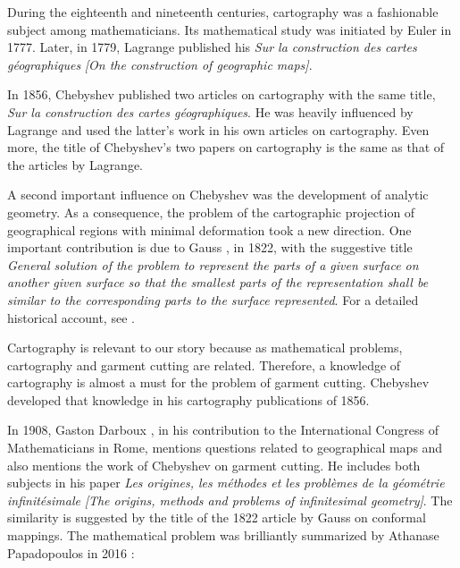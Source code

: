 \documentclass[12pt]{article}
\begin{document}
\normalsize


\bigskip

During the eighteenth and nineteenth centuries, cartography was a fashionable subject among mathematicians. Its mathematical study was initiated by Euler in 1777. Later, in 1779, Lagrange \cite{Lagrange1779} published his {\it Sur la construction des cartes g\'eographiques} {\it [On the construction of geographic maps]}.

In 1856, Chebyshev published two articles \cite{Chebyshev1856a,Chebyshev1856b} on cartography with the same title, {\it Sur la construction des cartes g\'eographiques}. He was heavily influenced by Lagrange and used the latter's work in his own articles on cartography. Even more, the title of Chebyshev's two papers on cartography is the same as that of the articles by Lagrange.

A second important influence on Chebyshev was the development of analytic geometry. As a consequence, the problem of the cartographic projection of geographical regions with minimal deformation took a new direction. One important contribution is due to Gauss \cite{Gauss1822}, in 1822, with the suggestive title {\it General solution of the problem to represent the parts of a given surface on another given surface so that the smallest parts of the representation shall be similar to the corresponding parts to the surface represented}. For a detailed historical account, see \cite{Papadopoulos2022a,Papadopoulos2022b}.

Cartography is relevant to our story because as mathematical problems, cartography and garment cutting are related. Therefore, a knowledge of cartography is almost a must for the problem of garment cutting. Chebyshev developed that knowledge in his cartography publications of 1856.

In 1908, Gaston Darboux \cite{Darboux1909}, in his contribution to the International Congress of Mathematicians in Rome, mentions questions related to geographical maps and also mentions the work of Chebyshev on garment cutting. He includes both subjects in his paper {\it Les origines, les m\'ethodes et les probl\`emes de la g\'eom\'etrie infinit\'esimale} {\it [The origins, methods and problems of infinitesimal geometry]}. The similarity is suggested by the title of the 1822 article by Gauss on conformal mappings. The mathematical problem was brilliantly summarized by Athanase Papadopoulos in 2016 \cite{Papadopoulos2016}:
\end{document}
